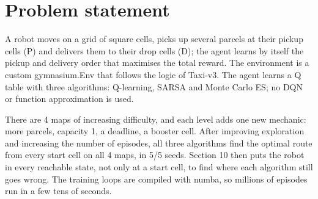\documentclass[12pt,a4paper]{article}
\begin{document}
{\linespread{1.0}\selectfont
\tableofcontents
\clearpage
\listoffigures
\listoftables
\clearpage}

\hypertarget{problem-statement}{%
\section{Problem statement}\label{problem-statement}}

A robot moves on a grid of square cells, picks up several parcels at
their pickup cells (P) and delivers them to their drop cells (D); the
agent learns by itself the pickup and delivery order that maximises the
total reward. The environment is a custom gymnasium.Env that follows the
logic of Taxi-v3. The agent learns a Q table with three algorithms:
Q-learning, SARSA and Monte Carlo ES; no DQN or function approximation
is used.

There are 4 maps of increasing difficulty, and each level adds one new
mechanic: more parcels, capacity 1, a deadline, a booster cell. After
improving exploration and increasing the number of episodes, all three
algorithms find the optimal route from every start cell on all 4 maps,
in 5/5 seeds. Section 10 then puts the robot in every reachable state,
not only at a start cell, to find where each algorithm still goes wrong.
The training loops are compiled with numba, so millions of episodes run
in a few tens of seconds.
\end{document}
